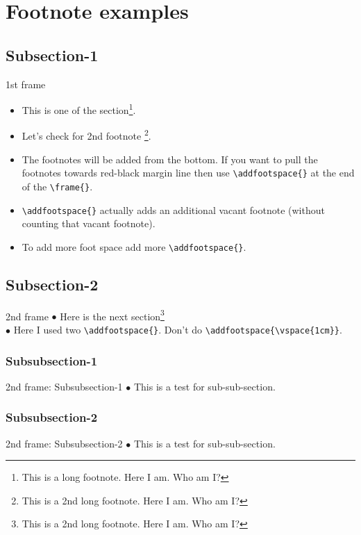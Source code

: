 \section{Footnote examples}
\subsection{Subsection-1}
\begin{frame}[fragile]{1st frame}
    \begin{itemize}
        \item This is one of the section\footnote{This is a long footnote. Here I am. Who am I?}. 
        \item Let's check for 2nd footnote \footnote{This is a 2nd long footnote. Here I am. Who am I?}.
        \item The footnotes will be added from the bottom. If you want to pull the footnotes towards red-black margin line then use \verb|\addfootspace{}| at the end of the \verb|\frame{}|.
        \item \verb|\addfootspace{}| actually adds an additional vacant footnote (without counting that vacant footnote).
        \item To add more foot space add more \verb|\addfootspace{}|. 
    \end{itemize}
\addfootspace{} %
\addfootspace{}
\end{frame}
\subsection{Subsection-2}
\begin{frame}[fragile]{2nd frame}
   $\bullet$ Here is the next section\footnote{This is a 2nd long footnote. Here I am. Who am I?}\\
   $\bullet$ Here I used two \verb|\addfootspace{}|. Don't do \verb|\addfootspace{\vspace{1cm}}|.
   \addfootspace{}\addfootspace{}
\end{frame}
\subsubsection{Subsubsection-1}
\begin{frame}{2nd frame: Subsubsection-1}
$\bullet$ This is a test for sub-sub-section.
\end{frame}
\subsubsection{Subsubsection-2}
\begin{frame}{2nd frame: Subsubsection-2}
$\bullet$ This is a test for sub-sub-section.
\end{frame}

